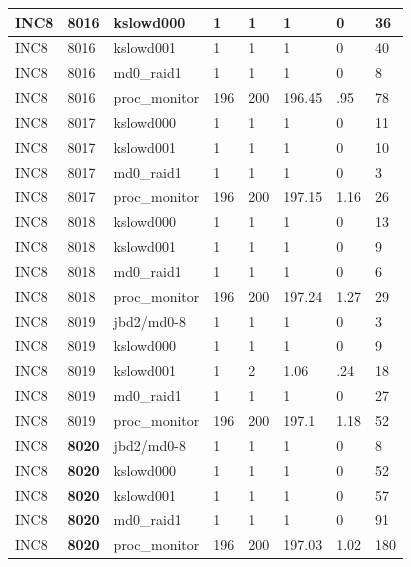 \begin{table}[h]
\begin{center}
{\begin{tabular}{l|l|l|l|l|l|l|l}
INC8     & 8016  & kslowd000     & 1     & 1     & 1     & 0     & 36\\ \hline
INC8     & 8016  & kslowd001     & 1     & 1     & 1     & 0     & 40\\ \hline
INC8     & 8016  & md0\_raid1     & 1     & 1     & 1     & 0     & 8\\ \hline
INC8     & 8016  & proc\_monitor  & 196   & 200   & 196.45        & .95   & 78\\ \hline\hline

INC8     & 8017  & kslowd000     & 1     & 1     & 1     & 0     & 11\\ \hline
INC8     & 8017  & kslowd001     & 1     & 1     & 1     & 0     & 10\\ \hline
INC8     & 8017  & md0\_raid1     & 1     & 1     & 1     & 0     & 3\\ \hline
INC8     & 8017  & proc\_monitor  & 196   & 200   & 197.15        & 1.16  & 26\\ \hline\hline

INC8     & 8018  & kslowd000     & 1     & 1     & 1     & 0     & 13\\ \hline
INC8     & 8018  & kslowd001     & 1     & 1     & 1     & 0     & 9\\ \hline
INC8     & 8018  & md0\_raid1     & 1     & 1     & 1     & 0     & 6\\ \hline
INC8     & 8018  & proc\_monitor  & 196   & 200   & 197.24        & 1.27  & 29\\ \hline\hline

INC8     & 8019  & jbd2/md0-8    & 1     & 1     & 1     & 0     & 3\\ \hline
INC8     & 8019  & kslowd000     & 1     & 1     & 1     & 0     & 9\\ \hline
INC8     & 8019  & kslowd001     & 1     & 2     & 1.06  & .24   & 18\\ \hline
INC8     & 8019  & md0\_raid1     & 1     & 1     & 1     & 0     & 27\\ \hline
INC8     & 8019  & proc\_monitor  & 196   & 200   & 197.1         & 1.18  & 52\\ \hline\hline

INC8     & {\bf 8020}  & jbd2/md0-8    & 1     & 1     & 1     & 0     & 8\\ \hline
INC8     & {\bf 8020}  & kslowd000     & 1     & 1     & 1     & 0     & 52\\ \hline
INC8     & {\bf 8020}  & kslowd001     & 1     & 1     & 1     & 0     & 57\\ \hline
INC8     & {\bf 8020}  & md0\_raid1     & 1     & 1     & 1     & 0     & 91\\ \hline
INC8     & {\bf 8020}  & proc\_monitor  & 196   & 200   & 197.03        & 1.02  & 180\\ \hline\hline


\end{tabular}}
\end{center}
\end{table}
